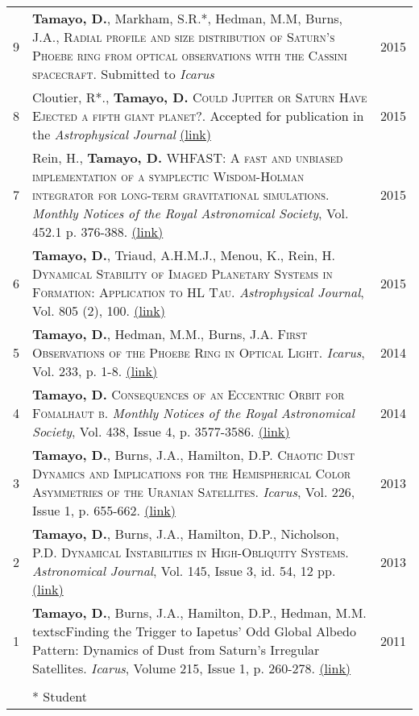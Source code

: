 \documentclass[10pt]{article} %
\begin{document}
\begin{tabular}{>{\hfill}r|p{14.3cm}l}
9 & {\bf Tamayo, D.}, Markham, S.R.*, Hedman, M.M, Burns, J.A., \textsc{Radial profile and size distribution of Saturn's Phoebe ring from optical observations with the Cassini spacecraft}.  Submitted to {\it Icarus} & 2015 \\

8 & Cloutier, R*., {\bf Tamayo, D.} \textsc{Could Jupiter or Saturn Have Ejected a fifth giant planet?}.  Accepted for publication in the {\it Astrophysical Journal} \href{http://arxiv.org/abs/1509.05397}{(link)} & 2015 \\

7 & Rein, H., {\bf Tamayo, D.} \textsc{WHFAST: A fast and unbiased implementation of a symplectic Wisdom-Holman integrator for long-term gravitational simulations}. {\it Monthly Notices of the Royal Astronomical Society}, Vol. 452.1 p. 376-388. \href{http://arxiv.org/abs/1506.01084}{(link)} & 2015 \\

6 & {\bf Tamayo, D.}, Triaud, A.H.M.J., Menou, K., Rein, H. \textsc{Dynamical Stability of Imaged Planetary Systems in Formation:  Application to HL Tau}. {\it Astrophysical Journal}, Vol. 805 (2), 100. \href{http://arxiv.org/abs/1502.05099}{(link)} & 2015 \\

5 & {\bf Tamayo, D.}, Hedman, M.M., Burns, J.A. \textsc{First Observations of the Phoebe Ring in Optical Light}. {\it Icarus}, Vol. 233, p. 1-8. \href{http://arxiv.org/abs/1401.6166}{(link)}& 2014  \\

4 & {\bf Tamayo, D.} \textsc{Consequences of an Eccentric Orbit for Fomalhaut b}. {\it Monthly Notices of the Royal Astronomical Society}, Vol. 438, Issue 4, p. 3577-3586. \href{http://arxiv.org/abs/1312.7020}{(link)} & 2014 \\

3 & {\bf Tamayo, D.}, Burns, J.A., Hamilton, D.P. \textsc{Chaotic Dust Dynamics and Implications for the Hemispherical Color Asymmetries of the Uranian Satellites}. {\it Icarus}, Vol. 226, Issue 1, p. 655-662. \href{http://arxiv.org/abs/1306.3973}{(link)} & 2013 \\ 

2 & {\bf Tamayo, D.}, Burns, J.A., Hamilton, D.P., Nicholson, P.D. \textsc{Dynamical Instabilities in High-Obliquity Systems}. {\it Astronomical Journal}, Vol. 145, Issue 3, id. 54, 12 pp. \href{http://arxiv.org/abs/1212.0028}{(link)} & 2013 \\

1 & {\bf Tamayo, D.}, Burns, J.A., Hamilton, D.P., Hedman, M.M. textsc{Finding the Trigger to Iapetus' Odd Global Albedo Pattern: Dynamics of Dust from Saturn's Irregular Satellites}. {\it Icarus}, Volume 215, Issue 1, p. 260-278. \href{http://arxiv.org/abs/1106.1893}{(link)} & 2011 \\

\multicolumn{3}{c}{} \\

& * Student
\end{tabular}
\end{document}
